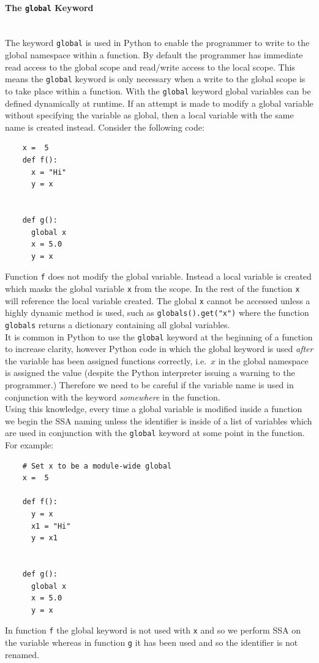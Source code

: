 \documentclass[12pt, titlepage]{article}
\begin{document}
\paragraph*{The \texttt{global} Keyword}\mbox{} \\
The keyword \texttt{global} is used in Python to enable the programmer to write to the global namespace within a function. By default the programmer has immediate read access to the global scope and read/write access to the local scope. This means the \texttt{global} keyword is only necessary when a write to the global scope is to take place within a function. With the \texttt{global} keyword global variables can be defined dynamically at runtime. If an attempt is made to modify a global variable without specifying the variable as global, then a local variable with the same name is created instead. Consider the following code:
\begin{lstlisting}
    x =  5
    def f():
      x = "Hi"
      y = x
      
      
    def g():
      global x
      x = 5.0
      y = x
\end{lstlisting}
Function \texttt{f} does not modify the global variable. Instead a local variable is created which masks the global variable \texttt{x} from the scope. In the rest of the function \texttt{x} will reference the local variable created. The global \texttt{x} cannot be accessed unless a highly dynamic method is used, such as \texttt{globals().get("x")} where the function \texttt{globals} returns a dictionary containing all global variables. \\
\indent It is common in Python to use the \texttt{global} keyword at the beginning of a function to increase clarity, however Python code in which the global keyword is used \textit{after} the variable has been assigned functions correctly, i.e.\ $x$ in the global namespace is assigned the value (despite the Python interpreter issuing a warning to the programmer.) Therefore we need to be careful if the variable name is used in conjunction with the keyword \textit{somewhere} in the function. \\
\indent Using this knowledge, every time a global variable is modified inside a function we begin the SSA naming unless the identifier is inside of a list of variables which are used in conjunction with the \texttt{global} keyword at some point in the function. For example:
\begin{lstlisting}
    # Set x to be a module-wide global
    x =  5
    
    def f():
      y = x
      x1 = "Hi"
      y = x1
      
     
    def g():
      global x
      x = 5.0
      y = x
\end{lstlisting}
In function \texttt{f} the global keyword is not used with \texttt{x} and so we perform SSA on the variable whereas in function \texttt{g} it has been used and so the identifier is not renamed.
\end{document}
